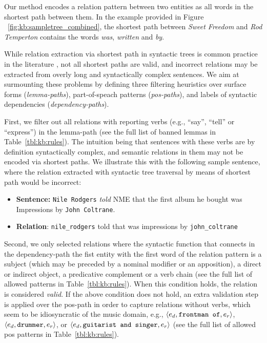 Our method encodes a relation pattern between two entities as all words in the shortest path between them. In the example provided in Figure ~\ref{fig:kb:sampletree_combined}, the shortest path between \emph{Sweet Freedom} and \emph{Rod Temperton} contains the words \textit{was}, \textit{written} and \textit{by}.

While relation extraction via shortest path in syntactic trees is common practice in the literature \citep{DelliBovietal2015b,MoroandNavigli2012,Nakasholeetal2012}, not all shortest paths are valid, and incorrect relations may be extracted from overly long and syntactically complex sentences. We aim at surmounting these problems by defining three filtering heuristics over surface forms (\textit{lemma-paths}), part-of-speach patterns (\textit{pos-paths}), and labels of syntactic dependencies (\textit{dependency-paths}).

First, we filter out all relations with reporting verbs (e.g., ``say'', ``tell'' or ``express'') in the lemma-path (see the full list of banned lemmas in Table~\ref{tbl:kb:rules}). The intuition being that sentences with these verbs are by definition syntactically complex, and semantic relations in them may not be encoded via shortest paths. We illustrate this with the following sample sentence, where the relation extracted with syntactic tree traversal by means of shortest path would be incorrect:

\begin{itemize}
\item[] \textbf{Sentence:} \texttt{Nile Rodgers} \textit{told} NME that the first album he bought was Impressions by \texttt{John Coltrane}.
\item[] \textbf{Relation}: \texttt{nile\_rodgers} told that was impressions by \texttt{john\_coltrane}
\end{itemize}

Second, we only selected relations where the syntactic function that connects in the dependency-path the fist entity with the first word of the relation pattern is a subject (which may be preceded by a nominal modifier or an apposition), a direct or indirect object, a predicative complement or a verb chain (see the full list of allowed patterns in Table~\ref{tbl:kb:rules}). When this condition holds, the relation is considered \textit{valid}. If the above condition does not hold, an extra validation step is applied over the pos-path in order to capture relations without verbs, which seem to be idiosyncratic of the music domain, e.g., $\langle e_d, \mbox{\texttt{frontman of}}, e_r \rangle$, $\langle e_d, \mbox{\texttt{drummer}}, e_r \rangle$, or $\langle e_d, \mbox{\texttt{guitarist and singer}}, e_r \rangle$ (see the full list of allowed pos patterns in Table~\ref{tbl:kb:rules}).


